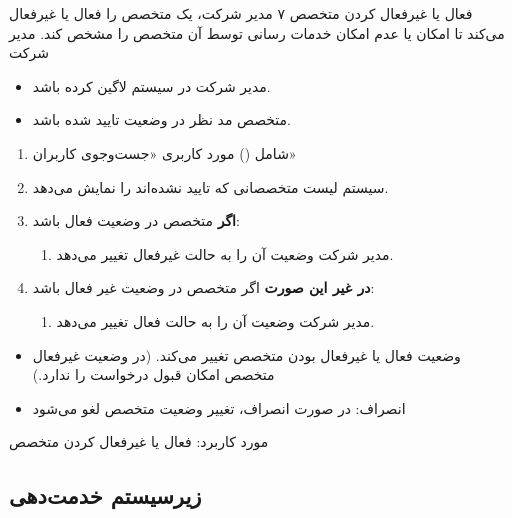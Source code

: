 \usecase
{فعال یا غیرفعال کردن متخصص}
{۷}
{مدیر شرکت، یک متخصص را فعال یا غیرفعال می‌کند تا امکان یا عدم امکان خدمات رسانی توسط آن متخصص را مشخص کند.}
{مدیر شرکت}
{}
{
\begin{itemize}
	\item 
	مدیر شرکت در سیستم لاگین کرده باشد.
	
	\item
	متخصص مد نظر در وضعیت تایید شده باشد.
\end{itemize}
}
{
\begin{enumerate}
	\item 
	شامل () مورد کاربری «جست‌وجوی کاربران»
	\item
	سیستم لیست متخصصانی که تایید نشده‌اند را نمایش می‌دهد.
	
	\item
	\textbf{اگر} متخصص در وضعیت فعال باشد:
	\begin{enumerate}
		\item 
		مدیر شرکت وضعیت آن را به حالت غیرفعال تغییر می‌دهد.
	\end{enumerate}

\item
	\textbf{در غیر این صورت } اگر متخصص در وضعیت غیر فعال باشد:
\begin{enumerate}[label=\theenumi.\arabic*.]
	\item 
	مدیر شرکت وضعیت آن را به حالت فعال تغییر می‌دهد.
\end{enumerate}
\end{enumerate}
}
{\begin{itemize}
		\item وضعیت فعال یا غیرفعال بودن متخصص تغییر می‌کند. (در وضعیت غیرفعال متخصص امکان قبول درخواست را ندارد.)
\end{itemize}}
{
\begin{itemize}
	\item انصراف: در صورت انصراف، تغییر وضعیت متخصص لغو می‌شود
\end{itemize}
}
{مورد کاربرد: فعال یا غیرفعال کردن متخصص}


\newpage
\subsection{زیرسیستم خدمت‌دهی}



